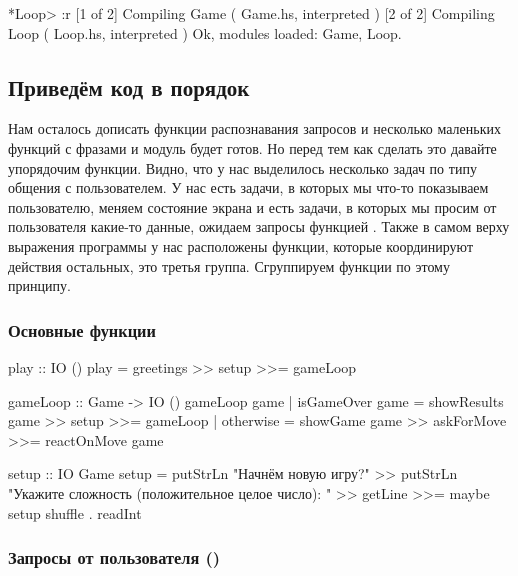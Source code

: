 \begin{code}
*Loop> :r
[1 of 2] Compiling Game             ( Game.hs, interpreted )
[2 of 2] Compiling Loop             ( Loop.hs, interpreted )
Ok, modules loaded: Game, Loop.
\end{code}

\subsection{Приведём код в порядок}

Нам осталось дописать функции распознавания запросов
и несколько маленьких функций с фразами
и модуль  будет готов. Но перед тем
как сделать это давайте упорядочим функции. 
Видно, что у нас выделилось несколько задач по
типу общения с пользователем. У нас есть задачи,
в которых мы что-то показываем пользователю, меняем
состояние экрана и есть задачи, в которых мы просим
от пользователя какие-то данные, ожидаем запросы
функцией . Также в самом верху выражения
программы у нас расположены функции, которые координируют
действия остальных, это третья группа. Сгруппируем функции по этому
принципу.

\subsubsection{Основные функции}

\begin{code}
play :: IO ()
play = greetings >> setup >>= gameLoop

gameLoop :: Game -> IO ()
gameLoop game 
    | isGameOver game   = showResults game >> setup >>= gameLoop
    | otherwise         = showGame game >> askForMove >>= reactOnMove game

setup :: IO Game
setup = putStrLn "Начнём новую игру?" >>
    putStrLn "Укажите сложность (положительное целое число): " >>
    getLine >>= maybe setup shuffle . readInt 
\end{code}

\subsubsection{Запросы от пользователя ()}



